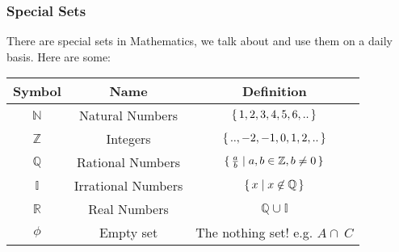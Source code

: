 \subsubsection{Special Sets}
There are special sets in Mathematics, we talk about and use them on a daily basis. Here are some:
\begin{center}
\begin{tabular}{| c | c | c | }
\hline
Symbol & Name & Definition \\
\hline
$\mathbb{N}$      & Natural Numbers & $\set{1,2,3,4,5,6,..}$ \\
$\mathbb{Z}$      & Integers  & $\set{..,-2,-1,0,1,2,..}$        \\
$\mathbb{Q}$      & Rational Numbers & $\set{ \frac{a}{b} \mid a,b \in \mathbb{Z}, b \neq 0}$  \\
$\mathbb{I}$      & Irrational Numbers & $\set{ x \mid x \not\in \mathbb{Q}}$ \\
$\mathbb{R}$      & Real Numbers  &  $\mathbb{Q} \cup \mathbb{I}$  \\
$\mathbb{\phi}$   & Empty set   &   The nothing set! e.g. $A \cap \  C$ \\
\hline
\end{tabular}
\end{center}
